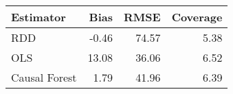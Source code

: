 \begin{table}[ht]
\centering
\begin{tabular}{lrrr}
  \hline
Estimator & Bias & RMSE & Coverage \\ 
  \hline
RDD & -0.46 & 74.57 & 5.38 \\ 
  OLS & 13.08 & 36.06 & 6.52 \\ 
  Causal Forest & 1.79 & 41.96 & 6.39 \\ 
   \hline
\end{tabular}
\caption{} 
\end{table}
